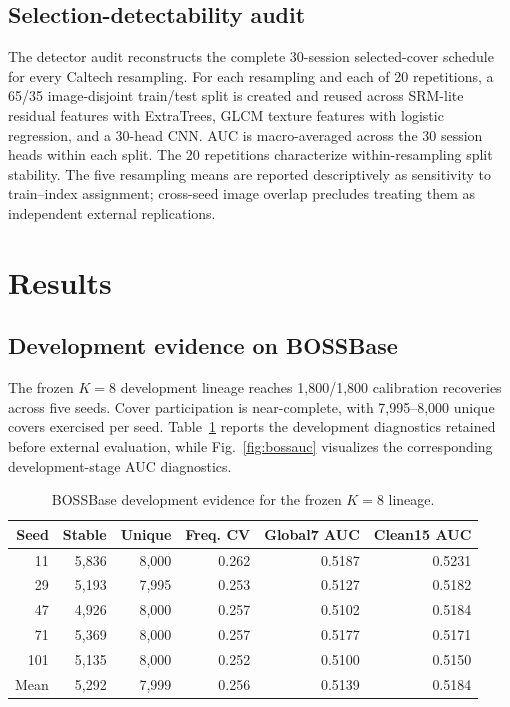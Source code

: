\subsection{Selection-detectability audit}
The detector audit reconstructs the complete 30-session selected-cover schedule for every Caltech resampling. For each resampling and each of 20 repetitions, a 65/35 image-disjoint train/test split is created and reused across SRM-lite residual features with ExtraTrees, GLCM texture features with logistic regression, and a 30-head CNN. AUC is macro-averaged across the 30 session heads within each split. The 20 repetitions characterize within-resampling split stability. The five resampling means are reported descriptively as sensitivity to train--index assignment; cross-seed image overlap precludes treating them as independent external replications.

\section{Results}
\subsection{Development evidence on BOSSBase}
The frozen $K=8$ development lineage reaches 1,800/1,800 calibration recoveries across five seeds. Cover participation is near-complete, with 7,995--8,000 unique covers exercised per seed. Table~\ref{tab:boss} reports the development diagnostics retained before external evaluation, while Fig.~\ref{fig:bossauc} visualizes the corresponding development-stage AUC diagnostics.

\begin{table}[!htbp]
\caption{BOSSBase development evidence for the frozen $K=8$ lineage.}
\label{tab:boss}
\small
\begin{tabular}{rrrrrr}
\toprule
Seed & Stable & Unique & Freq. CV & Global7 AUC & Clean15 AUC\\
\midrule
11 & 5,836 & 8,000 & 0.262 & 0.5187 & 0.5231\\
29 & 5,193 & 7,995 & 0.253 & 0.5127 & 0.5182\\
47 & 4,926 & 8,000 & 0.257 & 0.5102 & 0.5184\\
71 & 5,369 & 8,000 & 0.257 & 0.5177 & 0.5171\\
101 & 5,135 & 8,000 & 0.252 & 0.5100 & 0.5150\\
\midrule
Mean & 5,292 & 7,999 & 0.256 & 0.5139 & 0.5184\\
\bottomrule
\end{tabular}
\end{table}

